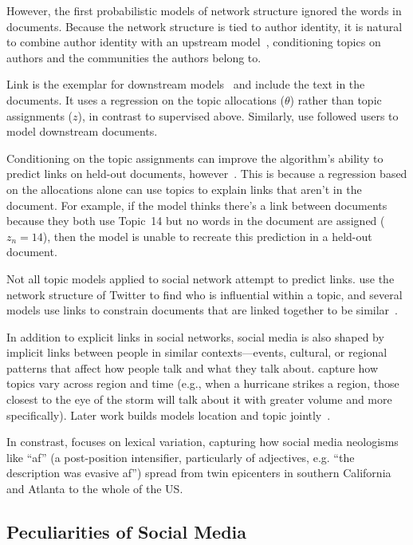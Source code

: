 However, the first probabilistic models of network structure ignored
the words in documents.  Because the network structure is tied to
author identity, it is natural to combine author identity with
an upstream model~\citet{mccallum-05b,liu-09}, conditioning topics on
authors and the communities the authors belong to.

Link  is the exemplar for downstream
models~\citep{nallapati-08} and include the text in the documents.  It
uses a regression on the topic allocations ($\theta$) rather than
topic assignments ($z$), in contrast to supervised  above.  Similarly, \citet{cha-12} use
followed users to model downstream documents.

Conditioning on the topic assignments can improve the algorithm's
ability to predict links on held-out documents,
however~\citep{chang-09a}.  This is because a regression based on the
allocations alone can use topics to explain links that aren't in the
document.  For example, if the model thinks there's a link between
documents because they both use Topic~14 but no words in the document
are assigned ($z_n=14$), then the model is unable to recreate this
prediction in a held-out document.  

Not all topic models applied to social network attempt to predict
links.  \citet{weng-10} use the network structure of Twitter to find
who is influential within a topic, and several models use links to
constrain documents that are linked together to be
similar~\citep{mei-08,sun-09,daume-09}.

In addition to explicit links in social networks, social media is also
shaped by implicit links between people in similar contexts---events,
cultural, or regional patterns that affect how people talk and what
they talk about.  \citet{mei-06} capture how topics vary across region
and time (e.g., when a hurricane strikes a region, those closest to
the eye of the storm will talk about it with greater volume and more
specifically).  Later work builds models location and topic
jointly~\citep{yin-11}.

In constrast, \citet{eisenstein-17} focuses on lexical variation,
capturing how social media neologisms like ``af'' (a post-position
intensifier, particularly of adjectives, e.g. ``the description was
evasive af'') spread from twin epicenters in southern California and
Atlanta to the whole of the US.

\subsection{Peculiarities of Social Media}
\label{sec:twitter-strange}

